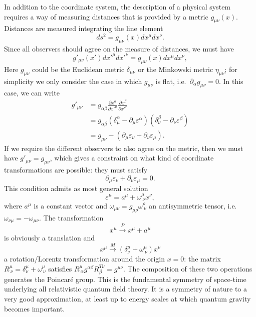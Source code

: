 \documentclass[a4paper,12pt]{article}
\numberwithin{equation}{section}
\begin{document}
In addition to the coordinate system, the description of a physical system requires a way of measuring distances that is provided by a metric $g_{\mu\nu}(x)$. Distances are measured integrating the line element
\begin{equation}
	ds^2 = g_{\mu\nu}(x) dx^\mu dx^\nu.
\end{equation}
Since all observers should agree on the measure of distances, we must have
\begin{equation}
	g'_{\mu\nu}(x') dx'^\mu dx'^\nu = g_{\mu\nu}(x) dx^\mu dx^\nu,
\end{equation}
Here $g_{\mu\nu}$ could be the Euclidean metric $\delta_{\mu\nu}$ or the Minkowski metric $\eta_{\mu\nu}$; for simplicity we only consider the case in which $g_{\mu\nu}$ is flat, i.e.~$\partial_\alpha g_{\mu\nu} = 0$.
In this case, we can write
\begin{equation}
\begin{aligned}
	g'_{\mu\nu} &= g_{\alpha\beta}
	\frac{\partial x^\alpha}{\partial x'^\mu}
	\frac{\partial x^\beta}{\partial x'^\nu}
	\\
	&= g_{\alpha\beta}
	\left( \delta^\alpha_\mu - \partial_\mu \varepsilon^\alpha \right)
	\left( \delta^\beta_\nu - \partial_\nu \varepsilon^\beta \right)
	\\
	&= g_{\mu\nu}
	- \left( \partial_\mu \varepsilon_\nu
	+ \partial_\nu \varepsilon_\mu \right).
\end{aligned}
\end{equation}
If we require the different observers to also agree on the metric, then  we must have $g'_{\mu\nu} = g_{\mu\nu}$, which gives a constraint on what kind of coordinate transformations are possible: they must satisfy
\begin{equation}
	\partial_\mu \varepsilon_\nu
	+ \partial_\nu \varepsilon_\mu = 0.
\end{equation}
This condition admits as most general solution
\begin{equation}
	\varepsilon^\mu = a^\mu + \omega^\mu_{~\nu} x^\nu,
\end{equation}
where $a^\mu$ is a constant vector and $\omega_{\mu\nu} = g_{\mu\rho} \omega^\rho_{~\nu}$ an antisymmetric tensor, i.e.~$\omega_{\nu\mu} = - \omega_{\mu\nu}$.
The transformation
\begin{equation}
	x^\mu \xrightarrow{P} x^\mu + a^\mu
\end{equation}
is obviously a translation and
\begin{equation}
	x^\mu \xrightarrow{M}
	\left( \delta^\mu_\nu + \omega^\mu_{~\nu} \right) x^\nu
\end{equation}
a rotation/Lorentz transformation around the origin $x = 0$: the matrix $R^\mu_{~\nu} = \delta^\mu_\nu + \omega^\mu_{~\nu}$ satisfies $R^\mu_{~\alpha} g^{\alpha\beta} R^{T\nu}_\beta = g^{\mu\nu}$. The composition of these two operations generates the Poincaré group.
This is the fundamental symmetry of space-time underlying all relativistic quantum field theory. It is a symmetry of nature to a very good approximation, at least up to energy scales at which quantum gravity becomes important.
\end{document}
